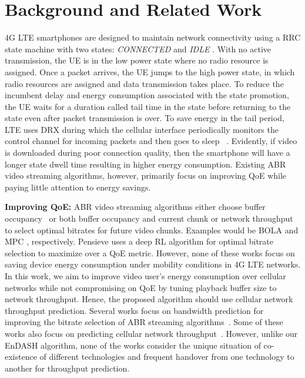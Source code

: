 \section{\textbf{Background and Related Work}}\label{sec:chap04:related_work}
\indent \ac{4G} LTE smartphones are designed to maintain network connectivity using a \ac{RRC} state machine with two states: \textit{CONNECTED} and \textit{IDLE} \cite{Huang2012}. With no active transmission, the \ac{UE} is in the low power  state where no radio resource is assigned.  Once a packet arrives, the  \ac{UE} jumps to the high power  state, in which radio resources are assigned and data transmission takes place.  To reduce the incumbent delay and energy consumption associated with the state promotion, the \ac{UE} waits for a duration called tail time in the  state before returning to the  state even after packet transmission is over. To save energy in the tail period, LTE uses  \ac{DRX} during which the cellular interface periodically monitors the control channel for incoming packets and then goes to sleep ~\cite{Huang2012}. Evidently, if video is downloaded during poor connection quality, then the smartphone will have a longer  state dwell time resulting in higher energy consumption. Existing \ac{ABR} video streaming algorithms, however, primarily focus on improving \ac{QoE} while paying little attention to energy savings.


\noindent \textbf{Improving QoE:}
\ac{ABR} video streaming algorithms either choose buffer occupancy~\cite{Huang2014,Spiteri2016}  or both buffer occupancy and current chunk or network throughput~\cite{MPC-SIGCOMM-2015,Jiang2014,Sengupta2018,Xu2015,Mehr2019} to select optimal bitrates for future video chunks. Examples would be BOLA \cite{Spiteri2016} and MPC \cite{MPC-SIGCOMM-2015}, respectively.
Pensieve \cite{mao2017neural} uses a deep RL algorithm for optimal bitrate selection to maximize over a \ac{QoE} metric. However, none of these  works focus on saving device energy consumption under mobility conditions in \ac{4G} LTE networks. \\
\indent In this work, we aim to improve video user's energy consumption over cellular networks while not compromising on \ac{QoE} by tuning playback buffer size to network throughput. Hence, the proposed algorithm should use cellular network throughput prediction.
Several works focus on bandwidth prediction for improving the bitrate selection of  ABR streaming algorithms~\cite{Bentaleb2019,Raca2019,Raca2018_2,yue2018linkforecast}. Some of these works also focus on predicting cellular network throughput~\cite{Raca2019,yue2018linkforecast,Raca2017,Raca2018_2,Raca2018_3,Samba2017, Ghasemi2018}. However, unlike our EnDASH algorithm, none of the works consider the unique situation of co-existence of different technologies and frequent handover from one technology to another for throughput prediction.


